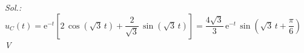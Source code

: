 \begin{enumerate}
  \emph{Sol.:
    $u_C(t)=
    \mathrm{e}^{-t}\left[2\,\cos(\sqrt{3}\,t)+\dfrac{2}{\sqrt{3}}\,\sin(\sqrt{3}\,t)\right]=\dfrac{4\sqrt{3}}{3}\,\mathrm{e}^{-t}\,\sin\left(\sqrt{3}\,t+\dfrac{\pi}{6}\right)$
    V}

\end{enumerate}
